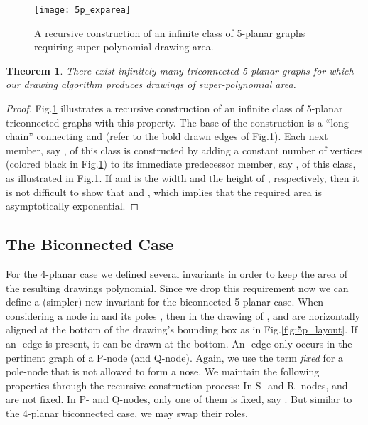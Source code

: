 \documentclass[a4paper,twoside,11pt]{article}
\newtheorem{theorem}{Theorem}
\begin{document}
\begin{figure}[t]
    \centering
    \texttt{[image: 5p\_exparea]}
    \caption{A recursive construction of an infinite class of 5-planar graphs requiring super-polynomial drawing area.}
    \label{fig:5p_exparea}
\end{figure}

\begin{theorem}
There exist infinitely many triconnected 5-planar graphs for which
our drawing algorithm produces drawings of super-polynomial area.
\label{thm:5planarExp}
\end{theorem}
\begin{proof}
Fig.\ref{fig:5p_exparea} illustrates a recursive construction of an
infinite class of 5-planar triconnected graphs with this property.
The base of the construction is a ``long chain'' connecting 
and  (refer to the bold drawn edges of
Fig.\ref{fig:5p_exparea}). Each next member, say , of
this class is constructed by adding a constant number of vertices
(colored black in Fig.\ref{fig:5p_exparea}) to its immediate
predecessor member, say , of this class, as illustrated in
Fig.\ref{fig:5p_exparea}. If  and  is the width and the
height of , respectively, then it is not difficult to show that
 and , which implies that the
required area is asymptotically exponential.
\end{proof}

\subsection{The Biconnected Case}
\label{sec:bicon}


For the 4-planar case we defined several invariants in order to keep
the area of the resulting drawings polynomial. Since we drop this
requirement now we can define a (simpler) new invariant for the
biconnected 5-planar case. When considering a node  in
 and its poles , then in
the drawing of ,  and  are horizontally aligned at
the bottom of the drawing's bounding box as in
Fig.\ref{fig:5p_layout}. If an -edge is present, it can be
drawn at the bottom. An -edge only occurs in the pertinent
graph of a P-node (and Q-node). Again, we use the term \emph{fixed}
for a pole-node that is not allowed to form a nose. We maintain the
following properties through the recursive construction process: In
S- and R- nodes,  and  are not fixed. In P- and Q-nodes, only
one of them is fixed, say . But similar to the 4-planar
biconnected case, we may swap their roles.
\end{document}
